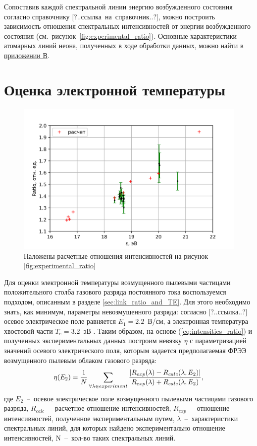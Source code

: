Сопоставив каждой спектральной линии энергию возбужденного состояния согласно справочнику [?..ссылка~на~справочник..?],
можно построить зависимость отношения спектральных интенсивностей от энергии возбужденного состояния (см.~рисунок~\ref{fig:experimental_ratio}).
Основные характеристики атомарных линий неона, полученных в ходе обработки данных, можно найти в \hyperref[app:app3]{приложении В}.

\section{Оценка электронной температуры}
\begin{figure}[t]
  \centering
  \includegraphics[width=16cm]{figures/Intensities_ratio}
  \caption{Наложены расчетные отношения интенсивностей на рисунок \ref{fig:experimental_ratio}}
  \label{fig:Intensities_ratio}
\end{figure}

Для оценки электронной температуры возмущенного пылевыми частицами положительного столба газового разряда постоянного
тока воспользуемся подходом, описанным в разделе \ref{sec:link_ratio_and_TE}. Для этого необходимо знать, как минимум,
параметры невозмущенного разряда: согласно [?..ссылка..?] осевое электрическое поле равняется $E_1 = 2.2$~В/см, а
электронная температура хвостовой части $T_e = 3.2$~эВ \cite{Zobnin2018}. Таким образом, на основе
(\ref{eq:intensities_ratio}) и полученных экспериментальных данных построим невязку $\eta$ с параметризацией значений
осевого электрического поля, которым задается предполагаемая ФРЭЭ возмущенного пылевым облаком газового разряда:
\begin{equation}
    \eta(E_2) = {1 \over N} \sum_{\forall \lambda \in experiment}{|R_{exp}(\lambda) - R_{calc}(\lambda, E_2)| \over {R_{exp}(\lambda) + R_{calc}(\lambda, E_2)}},
\end{equation}
где $E_2$~--~осевое электрическое поле возмущенного пылевыми частицами газового разряда, $R_{calc}$~--~расчетное
отношение интенсивностей, $R_{exp}$~--~отношение интенсивностей, полученное экспериментальным путем, $\lambda$~--~характеристики
спектральных линий, для которых найдено экспериментально отношение интенсивностей, N~--~кол-во таких спектральных линий.

